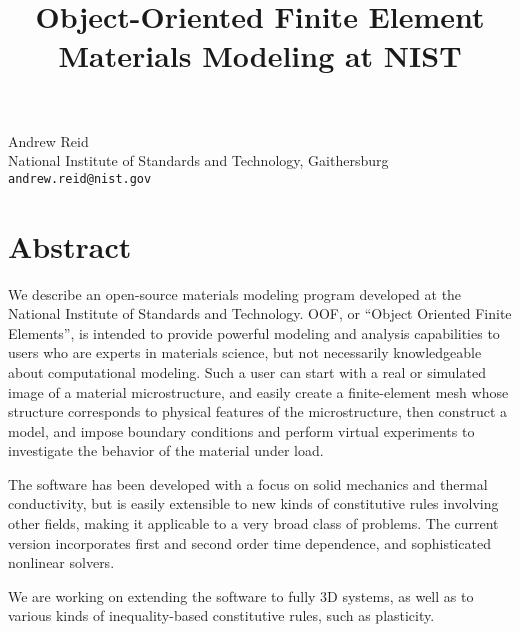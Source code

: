 \title{Object-Oriented Finite Element Materials Modeling at NIST}
\author{} \institute{}
\maketitle

\begin{center}
{\large Andrew Reid}\\
National Institute of Standards and Technology, Gaithersburg\\
{\tt andrew.reid@nist.gov}
\end{center}

\section*{Abstract}
We describe an open-source materials modeling program developed at the National Institute of Standards and Technology. OOF, or ``Object Oriented Finite Elements'', is intended to provide powerful modeling and analysis capabilities to users who are experts in materials science, but not necessarily knowledgeable about computational modeling.  Such a user can start with a real or simulated image of a material microstructure, and easily create a finite-element mesh whose structure corresponds to physical features of the microstructure, then construct a model, and impose boundary conditions and perform virtual experiments to investigate the behavior of the material under load.  

The software has been developed with a focus on solid mechanics and thermal conductivity, but is easily extensible to new kinds of constitutive rules involving other fields, making it applicable to a very broad class of problems.  The current version incorporates first and second order time dependence, and sophisticated nonlinear solvers.

We are working on extending the software to fully 3D systems, as well as to various kinds of inequality-based constitutive rules, such as plasticity.